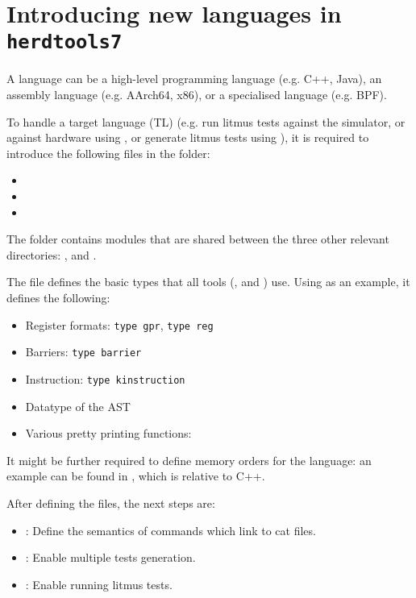 \section{Introducing new languages in \texttt{herdtools7}}
A language can be a high-level programming language (e.g. C++, Java), an
assembly language (e.g. AArch64, x86), or a specialised language (e.g. BPF).

To handle a target language (TL) (e.g. run litmus tests against the
\herd{} simulator, or against hardware using \litmus{}, or generate
litmus tests using \diy{}), it is required to introduce the following
files in the  folder:

\begin{itemize}
\item {}
\item {}
\item {}
\end{itemize}

The  folder contains modules that are shared between the three
other relevant directories: ,  and .

The  file defines the basic types that all tools
(\herd{}, \diy{} and \litmus{}) use. Using
 as an example, it defines the following:

\begin{itemize}
\item Register formats: \texttt{type gpr}, \texttt{type reg}
\item Barriers: \texttt{type barrier}
\item Instruction: \texttt{type kinstruction}
\item Datatype of the AST
\item Various pretty printing functions: 
\end{itemize}

It might be further required to define memory orders for the language: an
example can be found in , which is relative to C++.

After defining the  files, the next steps are:

\begin{itemize}
\item {}: Define the semantics of commands which link to cat files.
\item {}: Enable multiple tests generation.
\item {}: Enable running litmus tests.
\end{itemize}

